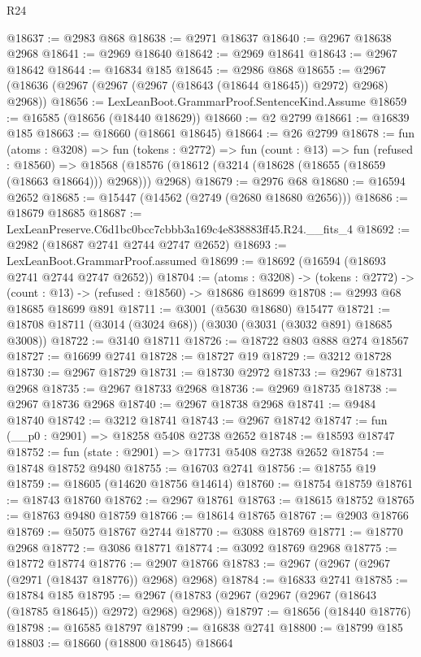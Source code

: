 \begin{lexlean}{R24}
\begin{coremodule}
@18637 := @2983 @868
@18638 := @2971 @18637
@18640 := @2967 @18638 @2968
@18641 := @2969 @18640
@18642 := @2969 @18641
@18643 := @2967 @18642
@18644 := @16834 @185
@18645 := @2986 @868
@18655 := @2967 (@18636 (@2967 (@2967 (@2967 (@18643 (@18644 @18645)) @2972) @2968) @2968))
@18656 := LexLeanBoot.GrammarProof.SentenceKind.Assume
@18659 := @16585 (@18656 (@18440 @18629))
@18660 := @2 @2799
@18661 := @16839 @185
@18663 := @18660 (@18661 @18645)
@18664 := @26 @2799
@18678 := fun (atoms : @3208) =>
  fun (tokens : @2772) =>
  fun (count : @13) =>
  fun (refused : @18560) =>
  @18568 (@18576 (@18612 (@3214 (@18628 (@18655 (@18659 (@18663 @18664))) @2968))) @2968)
@18679 := @2976 @68
@18680 := @16594 @2652
@18685 := @15447 (@14562 (@2749 (@2680 @18680 @2656)))
@18686 := @18679 @18685
@18687 := LexLeanPreserve.C6d1bc0bcc7cbbb3a169c4e838883ff45.R24.__fits_4
@18692 := @2982 (@18687 @2741 @2744 @2747 @2652)
@18693 := LexLeanBoot.GrammarProof.assumed
@18699 := @18692 (@16594 (@18693 @2741 @2744 @2747 @2652))
@18704 := (atoms : @3208) ->
  (tokens : @2772) -> (count : @13) -> (refused : @18560) -> @18686 @18699
@18708 := @2993 @68 @18685 @18699 @891
@18711 := @3001 (@5630 @18680) @15477
@18721 := @18708 @18711 (@3014 (@3024 @68)) (@3030 (@3031 (@3032 @891) @18685 @3008))
@18722 := @3140 @18711
@18726 := @18722 @803 @888 @274 @18567
@18727 := @16699 @2741
@18728 := @18727 @19
@18729 := @3212 @18728
@18730 := @2967 @18729
@18731 := @18730 @2972
@18733 := @2967 @18731 @2968
@18735 := @2967 @18733 @2968
@18736 := @2969 @18735
@18738 := @2967 @18736 @2968
@18740 := @2967 @18738 @2968
@18741 := @9484 @18740
@18742 := @3212 @18741
@18743 := @2967 @18742
@18747 := fun (__p0 : @2901) => @18258 @5408 @2738 @2652
@18748 := @18593 @18747
@18752 := fun (state : @2901) => @17731 @5408 @2738 @2652
@18754 := @18748 @18752 @9480
@18755 := @16703 @2741
@18756 := @18755 @19
@18759 := @18605 (@14620 @18756 @14614)
@18760 := @18754 @18759
@18761 := @18743 @18760
@18762 := @2967 @18761
@18763 := @18615 @18752
@18765 := @18763 @9480 @18759
@18766 := @18614 @18765
@18767 := @2903 @18766
@18769 := @5075 @18767 @2744
@18770 := @3088 @18769
@18771 := @18770 @2968
@18772 := @3086 @18771
@18774 := @3092 @18769 @2968
@18775 := @18772 @18774
@18776 := @2907 @18766
@18783 := @2967 (@2967 (@2967 (@2971 (@18437 @18776)) @2968) @2968)
@18784 := @16833 @2741
@18785 := @18784 @185
@18795 := @2967 (@18783 (@2967 (@2967 (@2967 (@18643 (@18785 @18645)) @2972) @2968) @2968))
@18797 := @18656 (@18440 @18776)
@18798 := @16585 @18797
@18799 := @16838 @2741
@18800 := @18799 @185
@18803 := @18660 (@18800 @18645) @18664

\end{coremodule}
\end{lexlean}
